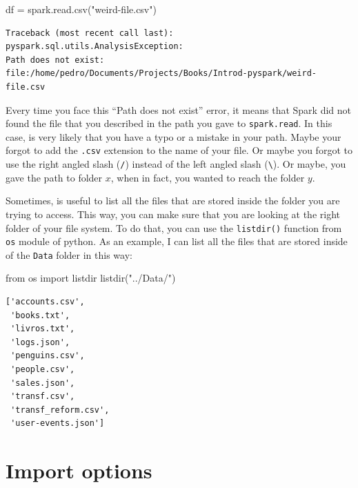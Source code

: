 \documentclass[
  11pt,
  letterpaper,
  DIV=11,
  numbers=noendperiod]{scrreprt}
\newenvironment{Shaded}{\begin{snugshade}}{\end{snugshade}}
\newcommand{\ImportTok}[1]{\textcolor[rgb]{0.00,0.46,0.62}{#1}}
\newcommand{\NormalTok}[1]{\textcolor[rgb]{0.00,0.23,0.31}{#1}}
\newcommand{\OperatorTok}[1]{\textcolor[rgb]{0.37,0.37,0.37}{#1}}
\newcommand{\StringTok}[1]{\textcolor[rgb]{0.13,0.47,0.30}{#1}}
\begin{document}
\begin{Shaded}
\begin{Highlighting}[]
\NormalTok{df }\OperatorTok{=}\NormalTok{ spark.read.csv(}\StringTok{"weird{-}file.csv"}\NormalTok{)}
\end{Highlighting}
\end{Shaded}

\begin{verbatim}
Traceback (most recent call last):
pyspark.sql.utils.AnalysisException:
Path does not exist:
file:/home/pedro/Documents/Projects/Books/Introd-pyspark/weird-file.csv
\end{verbatim}

Every time you face this ``Path does not exist'' error, it means that
Spark did not found the file that you described in the path you gave to
\texttt{spark.read}. In this case, is very likely that you have a typo
or a mistake in your path. Maybe your forgot to add the \texttt{.csv}
extension to the name of your file. Or maybe you forgot to use the right
angled slash (\texttt{/}) instead of the left angled slash
(\texttt{\textbackslash{}}). Or maybe, you gave the path to folder
\(x\), when in fact, you wanted to reach the folder \(y\).

Sometimes, is useful to list all the files that are stored inside the
folder you are trying to access. This way, you can make sure that you
are looking at the right folder of your file system. To do that, you can
use the \texttt{listdir()} function from \texttt{os} module of python.
As an example, I can list all the files that are stored inside of the
\texttt{Data} folder in this way:

\begin{Shaded}
\begin{Highlighting}[]
\ImportTok{from}\NormalTok{ os }\ImportTok{import}\NormalTok{ listdir}
\NormalTok{listdir(}\StringTok{"../Data/"}\NormalTok{)}
\end{Highlighting}
\end{Shaded}

\begin{verbatim}
['accounts.csv',
 'books.txt',
 'livros.txt',
 'logs.json',
 'penguins.csv',
 'people.csv',
 'sales.json',
 'transf.csv',
 'transf_reform.csv',
 'user-events.json']
\end{verbatim}

\hypertarget{import-options}{%
\section{Import options}\label{import-options}}
\end{document}
